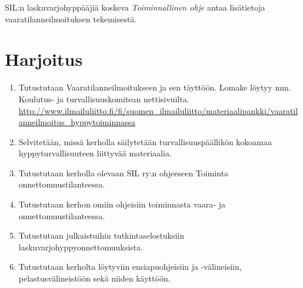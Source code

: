 SIL:n laskuvarjohyppääjiä koskeva \textit{Toiminnallinen ohje} antaa lisätietoja vaaratilanneilmoituksen tekemisestä.  

\section{ Harjoitus }
\label{riskitekijat-toiminta-onnettomuustilanteessa-ja-ensiapu-harjoitus}

\begin{enumerate}[label=\bfseries \arabic*)]
\item  Tutustutaan Vaaratilanneilmoitukseen ja sen täyttöön. Lomake löytyy mm. Koulutus- ja turvallisuuskomitean nettisivuilta. \url{http://www.ilmailuliitto.fi/fi/suomen_ilmailuliitto/materiaalipankki/vaaratilanneilmoitus_hyppytoiminnassa} 
\item  Selvitetään, missä kerholla säilytetään turvallisuuspäällikön kokoamaa hyppyturvallisuuteen liittyvää materiaalia. 
\item  Tutustutaan kerholla olevaan SIL ry:n ohjeeseen Toiminta onnettomuustilanteessa. 
\item  Tutustutaan kerhon omiin ohjeisiin toiminnasta vaara- ja onnettomuustilanteessa.  
\item  Tutustutaan julkaistuihin tutkintaselostuksiin laskuvarjohyppyonnettomuuksista. 
\item  Tutustutaan kerholta löytyviin ensiapuohjeisiin ja -välineisiin, pelastusvälineistöön sekä niiden käyttöön. 
\end{enumerate}
